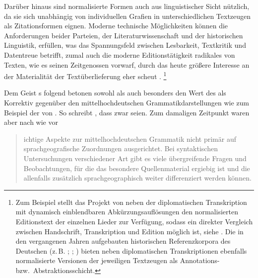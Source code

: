 Darüber hinaus sind normalisierte Formen auch aus
linguistischer Sicht nützlich, da sie sich unabhängig von individuellen Grafien
in unterschiedlichen Textzeugen als Zitations\-formen eignen. Moderne
technische Möglich\-keiten können die Anforderungen beider Parteien, der
Literaturwissenschaft und der historischen
Linguistik, erfüllen, was das Spannungsfeld zwischen
Lesbarkeit, Textkritik und Datentreue betrifft, zumal auch die moderne
Editionstätigkeit radikales  von Texten, wie
\citet{wilhelm1932} es seinen Zeitgenossen vorwarf, durch das heute
größere Interesse an der Materialität der Textüberlieferung
eher scheut \autocite[vgl.][1306]{wegera2000}.%
%
	\footnote{Zum Beispiel stellt das Projekt  von
	\citet{ldmdigital} neben der diplomatischen Transkription
	mit dynamisch einblendbaren Abkürzungsauflösungen den
	normalisierten Editionstext der
	einzelnen Lieder zur Verfügung, sodass ein direkter Vergleich zwischen
	Handschrift, Transkription und Edition möglich ist, siehe
	. Die in den vergangenen Jahren aufgebauten
	historischen Referenzkorpora des Deutschen (z.\,B.
	\cite[vgl.][522--523]{dipper2015}; \cite{rem}; \cite{ddd}) bieten neben
	diplomatischen Transkriptionen ebenfalls normalisierte Versionen der
	jeweiligen Textzeugen als Annotations- bzw.\
	Abstraktionsschicht.}

Dem Geist \citeauthor{wilhelm1932}s folgend betonen sowohl \citet{deboor1976}
als auch \citet{schulze2011} besonders den Wert des \CAO{} als
Korrektiv gegenüber den
mittelhochdeutschen Grammatik\-darstel\-lungen wie zum
Beispiel der von \citet{paul2007}. So schreibt \citet[22]{schulze2011}, dass
zwar 
seien. Zum damaligen Zeitpunkt waren aber nach wie vor
\blockcquote[22]{schulze2011}{ichtige Aspekte zur
mittelhochdeutschen Grammatik \textelp{} nicht primär auf
sprachgeografische\is{Dialektgeografie} Zuordnungen ausgerichtet. Bei
syntaktischen Untersuchungen verschiedener Art gibt es viele übergreifende
Fragen und Beobachtungen, für die das besondere Quellenmaterial ergiebig ist
und die allenfalls zusätzlich sprachgeographisch\is{Dialektgeografie} weiter
differenziert werden können.}

